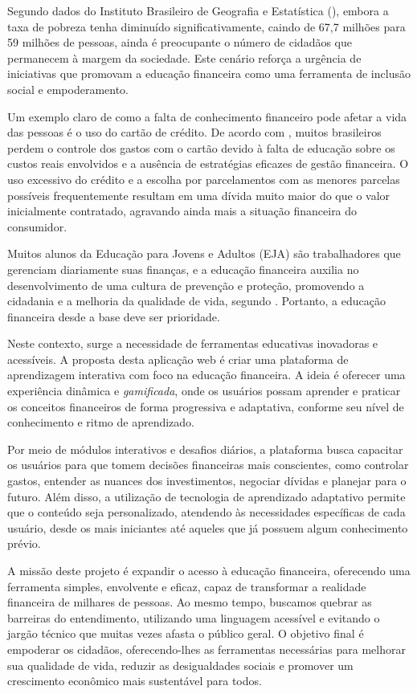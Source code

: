 \documentclass[
	article,			%
	12pt,				%
	oneside,			%
	a4paper,			%
	english,			%
	brazil,				%
	sumario=tradicional
	]{abntex2}
\begin{document}
Segundo dados do Instituto Brasileiro de Geografia e Estatística (), embora a taxa de pobreza tenha diminuído significativamente, caindo de 67,7 milhões para 59 milhões de pessoas, ainda é preocupante o número de cidadãos que permanecem à margem da sociedade. Este cenário reforça a urgência de iniciativas que promovam a educação financeira como uma ferramenta de inclusão social e empoderamento.

Um exemplo claro de como a falta de conhecimento financeiro pode afetar a vida das pessoas é o uso do cartão de crédito. De acordo com , muitos brasileiros perdem o controle dos gastos com o cartão devido à falta de educação sobre os custos reais envolvidos e a ausência de estratégias eficazes de gestão financeira. O uso excessivo do crédito e a escolha por parcelamentos com as menores parcelas possíveis frequentemente resultam em uma dívida muito maior do que o valor inicialmente contratado, agravando ainda mais a situação financeira do consumidor.

Muitos alunos da Educação para Jovens e Adultos (EJA) são trabalhadores que gerenciam diariamente suas finanças, e a educação financeira auxilia no desenvolvimento de uma cultura de prevenção e proteção, promovendo a cidadania e a melhoria da qualidade de vida, segundo . Portanto, a educação financeira desde a base deve ser prioridade.

Neste contexto, surge a necessidade de ferramentas educativas inovadoras e acessíveis. A proposta desta aplicação web é criar uma plataforma de aprendizagem interativa com foco na educação financeira. A ideia é oferecer uma experiência dinâmica e \textit{gamificada}, onde os usuários possam aprender e praticar os conceitos financeiros de forma progressiva e adaptativa, conforme seu nível de conhecimento e ritmo de aprendizado. 

Por meio de módulos interativos e desafios diários, a plataforma busca capacitar os usuários para que tomem decisões financeiras mais conscientes, como controlar gastos, entender as nuances dos investimentos, negociar dívidas e planejar para o futuro. Além disso, a utilização de tecnologia de aprendizado adaptativo permite que o conteúdo seja personalizado, atendendo às necessidades específicas de cada usuário, desde os mais iniciantes até aqueles que já possuem algum conhecimento prévio.

A missão deste projeto é expandir o acesso à educação financeira, oferecendo uma ferramenta simples, envolvente e eficaz, capaz de transformar a realidade financeira de milhares de pessoas. Ao mesmo tempo, buscamos quebrar as barreiras do entendimento, utilizando uma linguagem acessível e evitando o jargão técnico que muitas vezes afasta o público geral. O objetivo final é empoderar os cidadãos, oferecendo-lhes as ferramentas necessárias para melhorar sua qualidade de vida, reduzir as desigualdades sociais e promover um crescimento econômico mais sustentável para todos.
\end{document}
